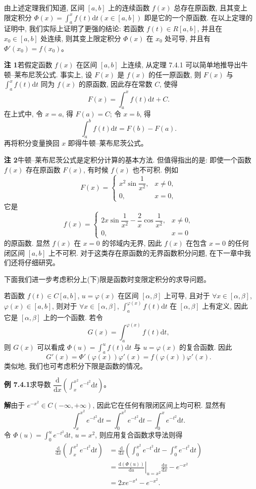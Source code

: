 \documentclass[UTF8, 12pt, fontset=fandol, oneside]{ctexart}
\begin{document}
由上述定理我们知道, 区间 $[a,b]$ 上的连续函数 $f(x)$ 总存在原函数, 且其变上限定积分 $\Phi(x)=\int_a^x f(t)\mathrm dt(x\in[a,b])$ 即是它的一个原函数. 在以上定理的证明中, 我们实际上证明了更强的结论: 若函数 $f(t)\in R[a,b]$, 并且在 $x_0\in[a,b]$ 处连续, 则其变上限定积分 $\Phi(x)$ 在 $x_0$ 处可导, 并且有 $\Phi'(x_0)=f(x_0)$。

\noindent\textbf{注 1}\quad 若假定函数 $f(x)$ 在区间 $[a,b]$ 上连续, 从定理 7.4.1 可以简单地推导出牛顿--莱布尼茨公式. 事实上, 设 $F(x)$ 是 $f(x)$ 的任一原函数, 则 $F(x)$ 与 $\int_a^x f(t)\mathrm dt$ 同为 $f(x)$ 的原函数, 因此存在常数 $C$, 使得
\[
  F(x)=\int_a^x f(t)\mathrm dt+C.
\]
在上式中, 令 $x=a$, 得 $F(a)=C$; 令 $x=b$, 得
\[
  \int_a^b f(t)\mathrm dt=F(b)-F(a).
\]
再将积分变量换回 $x$ 即得牛顿--莱布尼茨公式。

\noindent\textbf{注 2}\quad 牛顿--莱布尼茨公式是定积分计算的基本方法. 但值得指出的是: 即使一个函数 $f(x)$ 存在原函数 $F(x)$, 有时候 $f(x)$ 也不可积. 例如
\[
  F(x)=
  \begin{cases}
    x^2\sin\dfrac{1}{x^2}, & x\neq0,\\
    0, & x=0,
  \end{cases}
\]
它是
\[
  f(x)=
  \begin{cases}
    2x\sin\dfrac{1}{x^2}-\dfrac{2}{x}\cos\dfrac{1}{x^2}, & x\neq0,\\
    0, & x=0
  \end{cases}
\]
的原函数. 显然 $f(x)$ 在 $x=0$ 的邻域内无界, 因此 $f(x)$ 在包含 $x=0$ 的任何闭区间 $[a,b]$ 上不可积. 对于这类存在原函数的无界函数积分问题, 在下一章中我们还将仔细研究。

下面我们进一步考虑积分上(下)限是函数时变限定积分的求导问题。

若函数 $f(t)\in C[a,b]$, $u=\varphi(x)$ 在区间 $[\alpha,\beta]$ 上可导, 且对于 $\forall x\in[\alpha,\beta]$, $\varphi(x)\in[a,b]$, 则对于 $\forall x\in[\alpha,\beta]$, $\int_a^{\varphi(x)} f(t)\mathrm dt$ 在 $[\alpha,\beta]$ 上有定义, 因此它是 $[\alpha,\beta]$ 上的一个函数. 若令
\[
  G(x)=\int_a^{\varphi(x)} f(t)\mathrm dt,
\]
则 $G(x)$ 可以看成 $\Phi(u)=\int_a^u f(t)\mathrm dt$ 与 $u=\varphi(x)$ 的复合函数. 因此
\[
  G'(x)=\Phi'(\varphi(x))\varphi'(x)=f(\varphi(x))\varphi'(x).
\]
类似地, 我们也可考虑积分下限是函数的情况。

\noindent\textbf{例 7.4.1}\quad 求导数 $\dfrac{\mathrm d}{\mathrm dx}\left(\int_x^{x^2} e^{-t^2}\mathrm dt\right)$。

\noindent\textbf{解}\quad 由于 $e^{-x^2}\in C(-\infty,+\infty)$, 因此它在任何有限闭区间上均可积. 显然有
\[
  \int_x^{x^2} e^{-t^2}\mathrm dt=\int_0^{x^2} e^{-t^2}\mathrm dt-\int_0^x e^{-t^2}\mathrm dt.
\]
令 $\Phi(u)=\int_0^u e^{-t^2}\mathrm dt$, $u=x^2$, 则应用复合函数求导法则得
\[
\begin{aligned}
  \frac{\mathrm d}{\mathrm dx}\left(\int_x^{x^2} e^{-t^2}\mathrm dt\right)
  &=\frac{\mathrm d}{\mathrm dx}\left(\int_0^{x^2} e^{-t^2}\mathrm dt-\int_0^x e^{-t^2}\mathrm dt\right)\\
  &=\left.\frac{\mathrm d(\Phi(u))}{\mathrm du}\right|_{u=x^2}\frac{\mathrm du}{\mathrm dx}-e^{-x^2}\\
  &=2xe^{-x^4}-e^{-x^2}.
\end{aligned}
\]
\end{document}
